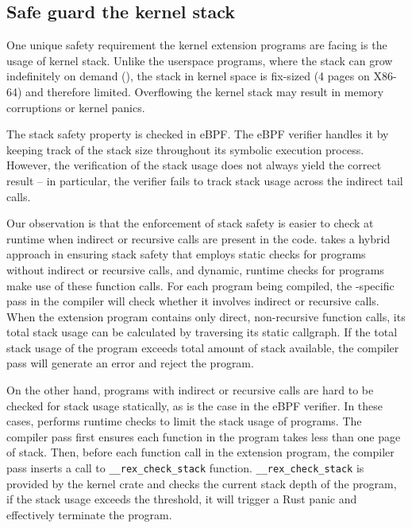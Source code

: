 \subsection{Safe guard the kernel stack}
One unique safety requirement the kernel extension programs are facing is the
    usage of kernel stack.
Unlike the userspace programs, where the stack can grow indefinitely on demand (),
    the stack in kernel space is fix-sized (4 pages on X86-64) and therefore
    limited.
Overflowing the kernel stack may result in memory corruptions or kernel panics.

The stack safety property is checked in eBPF.
The eBPF verifier handles it by keeping track of the stack size throughout its
    symbolic execution process.
However, the verification of the stack usage does not always yield the correct
    result -- in particular, the verifier fails to track stack usage across the
    indirect tail calls.

Our observation is that the enforcement of stack safety is easier to check at
    runtime when indirect or recursive calls are present in the code.
\projname{} takes a hybrid approach in ensuring stack safety that employs
    static checks for programs without indirect or recursive calls, and
    dynamic, runtime checks for programs make use of these function calls.
For each program being compiled, the \projname{}-specific pass in the compiler
    will check whether it involves indirect or recursive calls.
When the extension program contains only direct, non-recursive function calls,
    its total stack usage can be calculated by traversing its static callgraph.
If the total stack usage of the program exceeds total amount of stack
    available, the \projname{} compiler pass will generate an error and reject
    the program.

On the other hand, programs with indirect or recursive calls are hard to be
    checked for stack usage statically, as is the case in the eBPF verifier.
In these cases, \projname{} performs runtime checks to limit the stack usage of
    programs.
The \projname{} compiler pass first ensures each function in the program takes
    less than one page of stack.
Then, before each function call in the extension program, the \projname{}
    compiler pass inserts a call to \texttt{\_\_rex\_check\_stack} function.
\texttt{\_\_rex\_check\_stack} is provided by the kernel crate and checks the
    current stack depth of the program, if the stack usage exceeds the
    threshold, it will trigger a Rust panic and effectively terminate the
    program.

